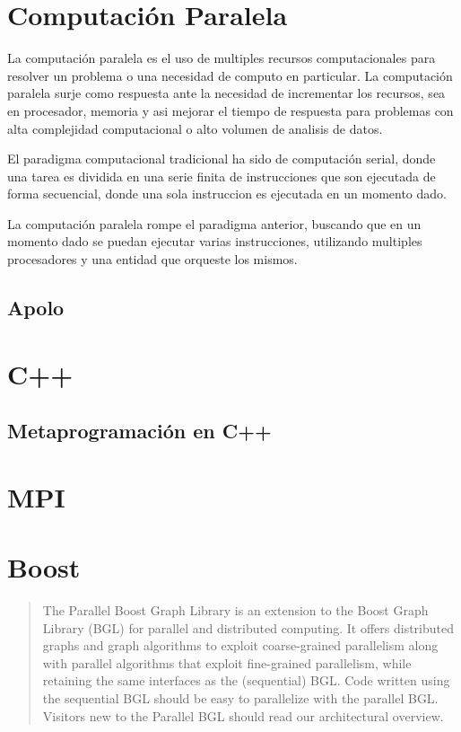 \documentclass[twoside,letterpaper,12pt]{report}
\begin{document}
\section{Computación Paralela}

La computación paralela es el uso de multiples recursos computacionales para resolver un problema o una necesidad de computo en particular. La computación paralela surje como respuesta ante la necesidad de incrementar los recursos, sea en procesador, memoria y asi mejorar el tiempo de respuesta para problemas con alta complejidad computacional o alto volumen de analisis de datos. 

El paradigma computacional tradicional ha sido de computación serial, donde una tarea es dividida en una serie finita de instrucciones que son ejecutada de forma secuencial, donde una sola instruccion es ejecutada en un momento dado. 

La computación paralela rompe el paradigma anterior, buscando que en un momento dado se puedan ejecutar varias instrucciones, utilizando multiples procesadores y una entidad que orqueste los mismos.  

\cite{PCI}
\cite{SC}

\subsection{Apolo}

\section{C++}
\subsection{Metaprogramación en C++}

\section{MPI}


\section{Boost}

\begin{quotation}
The Parallel Boost Graph Library is an extension to the Boost Graph Library (BGL) for parallel and distributed computing. It offers distributed graphs and graph algorithms to exploit coarse-grained parallelism along with parallel algorithms that exploit fine-grained parallelism, while retaining the same interfaces as the (sequential) BGL. Code written using the sequential BGL should be easy to parallelize with the parallel BGL. Visitors new to the Parallel BGL should read our architectural overview.\cite{wwwBoost} 
\end{quotation} 
\end{document}
